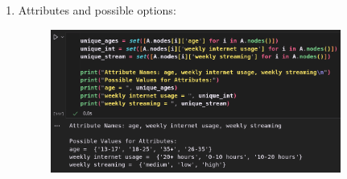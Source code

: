 \documentclass{article}
\begin{document}
\begin{enumerate}[label=(\alph*), left=10pt, itemsep=10pt]
        \item \begin{minipage}[t]{0.9\textwidth}
            Attributes and possible options:
            \begin{figure}[H]
                \centering
                \includegraphics[width=0.9\textwidth, height=0.3\textheight]{./2b.png}
            \end{figure}
        \end{minipage}


\end{enumerate}
\end{document}
